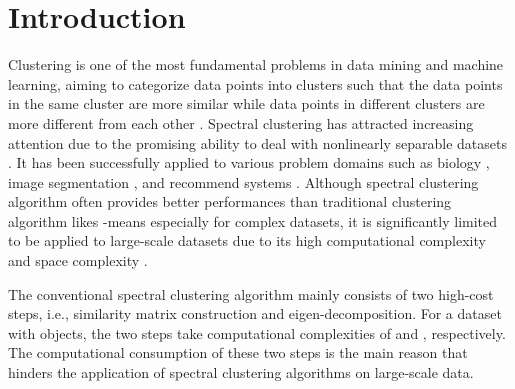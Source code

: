 \documentclass[a4paper,fleqn]{cas-dc}
\begin{document}
\maketitle



\section{Introduction}
Clustering is one of the most fundamental problems in data mining and machine learning, aiming to categorize data points into clusters such that the data points in the same cluster are more similar while data points in different clusters are more different from each other \cite{rokach2005clustering,xu2008clustering,liu2013understanding}.
Spectral clustering has attracted increasing attention due to the promising ability to deal with nonlinearly separable datasets \cite{filippone2008survey,ng2002spectral}.
It has been successfully applied to various problem domains such as biology \cite{pentney2005spectral}, image segmentation \cite{zhang2008spectral}, and recommend systems \cite{zhang2014detection,ye2018spectral}.
Although spectral clustering algorithm often provides better performances than traditional clustering algorithm likes -means especially for complex datasets, it is significantly limited to be applied to large-scale datasets due to its high computational complexity and space complexity \cite{li2015large,ye2018large}.

The conventional spectral clustering algorithm mainly consists of two high-cost steps, i.e., similarity matrix construction and eigen-decomposition.
For a dataset with  objects, the two steps take computational complexities of  and , respectively.
The computational consumption of these two steps is the main reason that hinders the application of spectral clustering algorithms on large-scale data.
\end{document}

